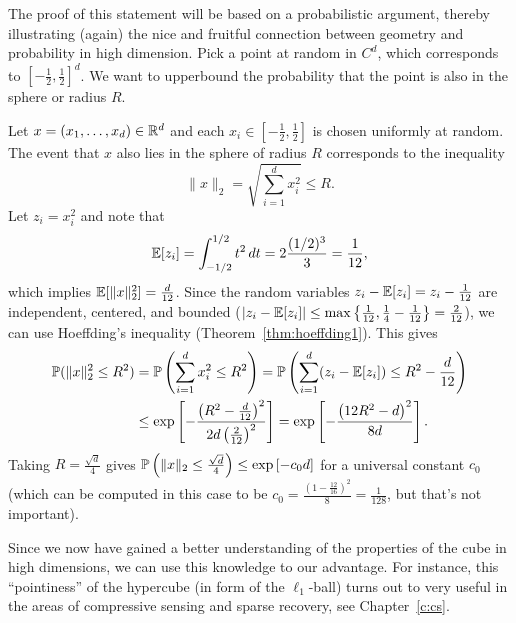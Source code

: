 The proof of this statement  will be based on a probabilistic argument, thereby illustrating (again) the nice and fruitful connection between geometry and probability in high dimension. Pick a point at random in $C^d$, which corresponds to $\left[-\frac12,\frac12\right]^d$.  We want to upperbound the probability that the point is also in the sphere or radius $R$.

  Let $x = (x_1, \dots, x_d) \in \R^d$ and each $x_i \in \left[-\frac12,\frac12\right]$ is chosen uniformly at random.  The event that
$x$ also lies in the sphere of radius $R$ corresponds to the inequality
$$\|x\|_2 = \sqrt{\sum_{i=1}^d x_i^2} \leq R.$$
Let $z_i = x_i^2$ and note that
  \begin{align*}
    \E [z_i] = \int_{-1/2}^{1/2} t^2 \, dt = 2\frac{(1/2)^3}{3}=\frac1{12}, %
  \end{align*}
  which implies $\E[\|x\|_2^2] = \frac{d}{12}$.
  Since the random variables $z_i - \E[z_i]=z_i-\frac1{12}$ are independent, centered, and bounded ($|z_i - \E[z_i]|\leq \max\left\{\frac{1}{12},\frac{1}{4}-\frac{1}{12}\right\}=\frac{2}{12}$), we can use Hoeffding's inequality (Theorem~\ref{thm:hoeffding1}). This gives 
  \begin{align*}
    \P(\|x\|_2^2 \leq R^2) &= \P\left(\sum_{i=1}^d x_i^2 \leq R^2\right)
    = \P\left(\sum_{i=1}^d (z_i - \E[z_i]) \leq R^2 - \frac{d}{12}\right) \\
    &\leq \exp\left[-\frac{\left(R^2-\frac{d}{12}\right)^2}{2d\left( \frac2{12} \right)^2}\right] =  \exp\left[-\frac{\left(12R^2-d\right)^2}{8d}\right]. 
  \end{align*}
Taking $R=\frac{\sqrt{d}}4$ gives $\P\left(\|x\|_2 \leq \frac{\sqrt{d}}4\right)\leq \exp\left[-c_0d\right]$ for a universal constant $c_0$ (which can be computed in this case to be $c_0=\frac{\left(1-\frac{12}{16}\right)^2}{8}=\frac1{128}$, but that's not important). 

\bigskip

Since we now have gained a better understanding of the properties of the cube in high dimensions, we can use this knowledge to our advantage. For instance, this ``pointiness'' of the hypercube (in form of the $\ell_1$-ball) turns out to very useful  in the areas of compressive sensing and sparse recovery, see Chapter~\ref{c:cs}.





